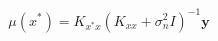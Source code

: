 \documentclass[preview]{standalone}
\begin{document}
\begin{align*}
\mu(x^*) = K_{x^*x}\left(K_{xx} + \sigma_n^2 I\right)^{-1}\mathbf{y}
\end{align*}
\end{document}
